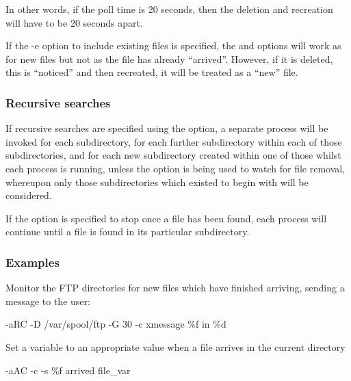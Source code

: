 In other words, if the poll time is 20 seconds, then the deletion and recreation will have to be 20 seconds apart.

If the -e option to include existing files is specified, the  
  and  options will work as for new files but not
 as the file has already ``arrived''. However, if it is deleted, this
is ``noticed'' and then recreated, it will be treated as a ``new'' file.

\subsubsection{Recursive searches}
If recursive searches are specified using the  option, a separate
\PrBtfilemon{} process will be invoked for each subdirectory, for each further subdirectory within each of those
subdirectories, and for each new subdirectory created within one of those whilst each process is running, unless the
 option is being used to watch for file removal, whereupon only those subdirectories which existed to begin
with will be considered.

If the  option is specified to stop once a file has been found, each process will continue until a file is found
in its particular subdirectory.

\subsubsection{Examples}
Monitor the FTP directories for new files which have finished arriving, sending a message to the user:

\begin{expara}

\BtfilemonName{} -aRC -D /var/spool/ftp -G 30 -c {\textquotedbl}xmessage
{\textquotesingle}\%f in \%d{\textquotesingle}{\textquotedbl}

\end{expara}

Set a \ProductName{} variable to an appropriate
value when a file arrives in the current directory

\begin{expara}

\BtfilemonName{} -aAC -c {\textquotedbl}\BtvarName{} -s {\textquotesingle}\%f arrived{\textquotesingle} file\_var{\textquotedbl}

\end{expara}

